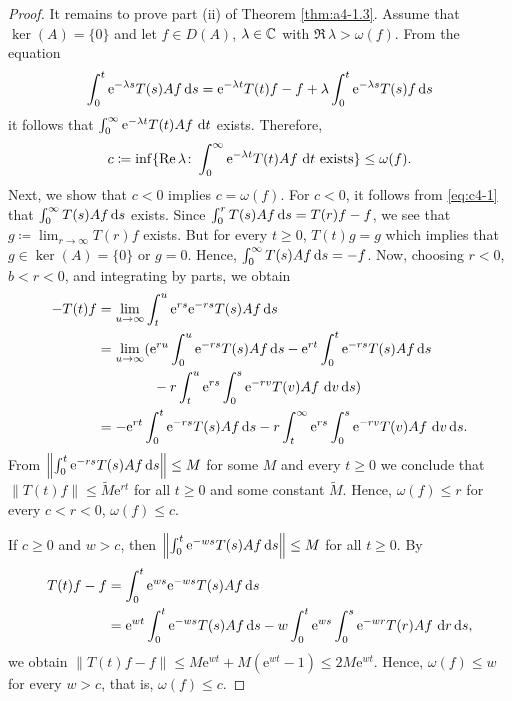 \begin{proof}
It remains to prove part (ii) of Theorem \ref{thm:a4-1.3}.
Assume that $\ker(A) = \{0\}$ and let $f \in D(A)$, $\lambda \in \mathbb{C}$ with $\Re\,\lambda > \omega(f)$. 
From the equation
\[
\int_{0}^{t} \mathrm{e}^{-\lambda s} T(s)Af  \mathop{}\!\mathrm{d}{s} = \mathrm{e}^{-\lambda t}T(t)f - f + \lambda \int_{0}^{t} \mathrm{e}^{-\lambda s} T(s)f  \mathop{}\!\mathrm{d}{s}
\]
it follows that $\int_{0}^{\infty} \mathrm{e}^{-\lambda t} T(t)Af \,\mathop{}\!\mathrm{d}{t}$ exists. 
Therefore, 
\[c \coloneqq \inf\{\mathop{}\!\mathrm{Re}\,\lambda\colon\int_{0}^{\infty} \mathrm{e}^{-\lambda t}T(t)Af \,\mathop{}\!\mathrm{d}{t} \text{ exists}\} \leq \omega(f).\]
Next, we show that $c < 0$ implies $c = \omega(f)$. 
For $c < 0$, it follows from \eqref{eq:c4-1} that $\int_{0}^{\infty} T(s)Af  \mathop{}\!\mathrm{d}{s}$ exists. 
Since $\int_{0}^{r} T(s)Af  \mathop{}\!\mathrm{d}{s} = T(r)f - f$, we see that $g \coloneqq\lim_{r \to \infty} T(r)f$ exists. 
But for every $t \geq 0$, $T(t)g = g$ which implies that $g \in \ker(A) = \{0\}$ or $g = 0$. 
Hence, $\int_{0}^{\infty} T(s)Af  \mathop{}\!\mathrm{d}{s} = -f$.
Now, choosing $r < 0$, $b < r < 0$, and integrating by parts, we obtain
\begin{align*}
-T(t)f &= \lim_{u \to \infty} \int_{t}^{u} \mathrm{e}^{r s} \mathrm{e}^{-r s} T(s)Af  \ds\\
&= \lim_{u \to \infty} ( \mathrm{e}^{ru}\int_0^u\mathrm{e}^{-rs} T(s)Af  \ds - \mathrm{e}^{rt}\int_0^t\mathrm{e}^{-rs} T(s)Af  \ds\\ 
& \qquad \qquad -r\int_t^u \mathrm{e}^{rs}\int_0^s \mathrm{e}^{-rv} T(v)Af\,\diff{v}  \ds
) \\
&= - \mathrm{e}^{rt}\int_0^t\mathrm{e}^{-rs} T(s)Af  \ds -r\int_t^\infty \mathrm{e}^{rs}\int_0^s \mathrm{e}^{-rv} T(v)Af\,\diff{v}  \ds.
\end{align*}
From $\left\|\int_{0}^{t} \mathrm{e}^{-r s} T(s)Af  \mathop{}\!\mathrm{d}{s}\right\| \leq M$ for some $M$ and every $t \geq 0$ we conclude that $\|T(t)f\| \leq \tilde{M}\mathrm{e}^{rt}$ for all $t \geq 0$ and some constant $\tilde{M}$.
Hence, $\omega(f) \leq r$ for every $c < r < 0$, \ie $\omega(f) \leq c$.

If $c \geq 0$ and $w > c$, then $\left\|\int_{0}^{t} \mathrm{e}^{-w s} T(s)Af \mathop{}\!\mathrm{d}{s}\right\| \leq M$ for all $t \geq 0$. 
By 
\begin{align*}
T(t)f - f &= \int_{0}^{t} \mathrm{e}^{w s} \mathrm{e}^{-w s} T(s)Af  \mathop{}\!\mathrm{d}{s}\\
&= \mathrm{e}^{wt}\int_0^t \mathrm{e}^{-ws} T(s)Af \mathop{}\!\mathrm{d}{s} - w\int_0^t\mathrm{e}^{ws}\int_0^s \mathrm{e}^{-wr} T(r)Af\, \mathop{}\!\mathrm{d}{r} \mathop{}\!\mathrm{d}{s},
\end{align*}
we obtain $\|T(t)f-f\| \leq M\mathrm{e}^{w t} + M(\mathrm{e}^{w t} - 1)
\le 2M\mathrm{e}^{wt}$. 
Hence, $\omega(f)\le w$ for every $w > c$, that is, $\omega(f) \leq c$.
\end{proof}
